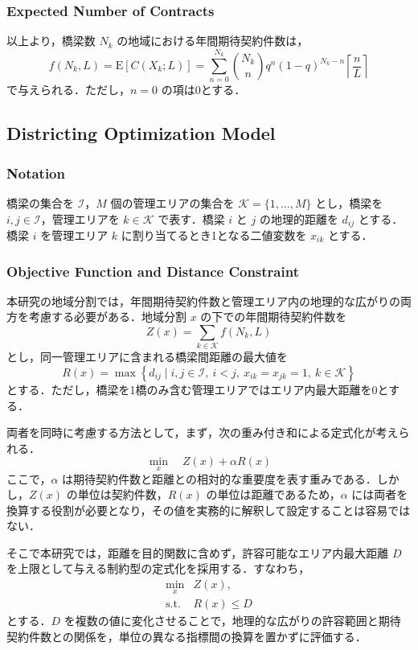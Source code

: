 \documentclass[Journal,letterpaper,InsideFigs,NoLineNumbers]{ascelike-new}
\newcommand{\E}{\mathrm{E}}
\begin{document}
\subsubsection{Expected Number of Contracts}

以上より，橋梁数 \(N_k\) の地域における年間期待契約件数は，
\[
f(N_k,L)
=
\E[C(X_k;L)]
=
\sum_{n=0}^{N_k}
{N_k\choose n}q^n(1-q)^{N_k-n}
\left\lceil\frac{n}{L}\right\rceil
\]
で与えられる．ただし，\(n=0\) の項は0とする．

\subsection{Districting Optimization Model}

\subsubsection{Notation}

橋梁の集合を \(\mathcal{I}\)，\(M\) 個の管理エリアの集合を \(\mathcal{K}=\{1,\ldots,M\}\) とし，橋梁を \(i,j\in\mathcal{I}\)，管理エリアを \(k\in\mathcal{K}\) で表す．橋梁 \(i\) と \(j\) の地理的距離を \(d_{ij}\) とする．橋梁 \(i\) を管理エリア \(k\) に割り当てるとき1となる二値変数を \(x_{ik}\) とする．

\subsubsection{Objective Function and Distance Constraint}

本研究の地域分割では，年間期待契約件数と管理エリア内の地理的な広がりの両方を考慮する必要がある．地域分割 \(x\) の下での年間期待契約件数を
\[
Z(x)=\sum_{k\in\mathcal{K}}f(N_k,L)
\]
とし，同一管理エリアに含まれる橋梁間距離の最大値を
\[
R(x)
=
\max\left\{d_{ij}\mid i,j\in\mathcal{I},\ i<j,\ x_{ik}=x_{jk}=1,\ k\in\mathcal{K}\right\}
\]
とする．ただし，橋梁を1橋のみ含む管理エリアではエリア内最大距離を0とする．

両者を同時に考慮する方法として，まず，次の重み付き和による定式化が考えられる．
\[
\min_x\quad Z(x)+\alpha R(x)
\]
ここで，\(\alpha\) は期待契約件数と距離との相対的な重要度を表す重みである．しかし，\(Z(x)\) の単位は契約件数，\(R(x)\) の単位は距離であるため，\(\alpha\) には両者を換算する役割が必要となり，その値を実務的に解釈して設定することは容易ではない．

そこで本研究では，距離を目的関数に含めず，許容可能なエリア内最大距離 \(D\) を上限として与える制約型の定式化を採用する．すなわち，
\[
\begin{array}{ll}
\displaystyle \min_x & Z(x),\\
\mathrm{s.t.} & R(x)\leq D
\end{array}
\]
とする．\(D\) を複数の値に変化させることで，地理的な広がりの許容範囲と期待契約件数との関係を，単位の異なる指標間の換算を置かずに評価する．
\end{document}
